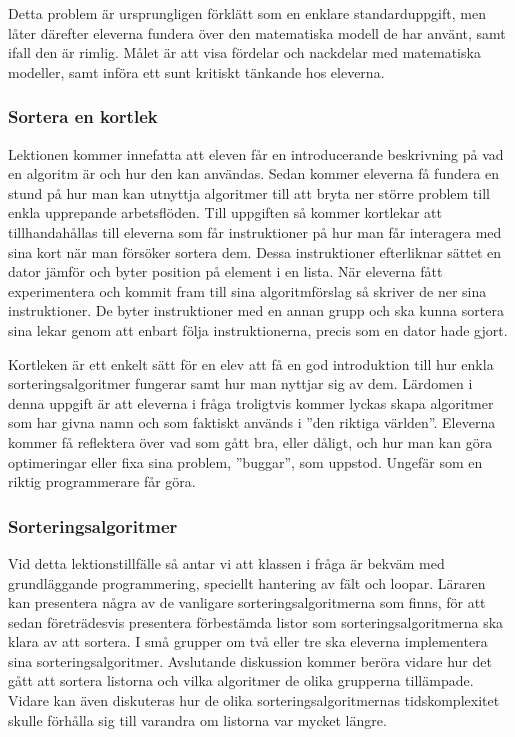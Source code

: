     \textcolor{lila}{Detta problem är ursprungligen förklätt som en enklare standarduppgift, men låter därefter eleverna fundera över den matematiska modell de har använt, samt ifall den är rimlig. Målet är att visa fördelar och nackdelar med matematiska modeller, samt införa ett sunt kritiskt tänkande hos eleverna.}
    
\subsubsection{Sortera en kortlek}
    \label{sec:Sortera}
    
    \textcolor{WildStrawberry}{
        Lektionen kommer innefatta att eleven får en introducerande beskrivning på vad en algoritm är och hur den kan användas. Sedan kommer eleverna få fundera en stund på hur man kan utnyttja algoritmer till att bryta ner större problem till enkla upprepande arbetsflöden. Till uppgiften så kommer kortlekar att tillhandahållas till eleverna som får instruktioner på hur man får interagera med sina kort när man försöker sortera dem. Dessa instruktioner efterliknar sättet en dator jämför och byter position på element i en lista. När eleverna fått experimentera och kommit fram till sina algoritmförslag så skriver de ner sina instruktioner. De byter instruktioner med en annan grupp och ska kunna sortera sina lekar genom att enbart följa instruktionerna, precis som en dator hade gjort.}
        
    \textcolor{WildStrawberry}{
        Kortleken är ett enkelt sätt för en elev att få en god introduktion till hur enkla sorteringsalgoritmer fungerar samt hur man nyttjar sig av dem. Lärdomen i denna uppgift är att eleverna i fråga troligtvis kommer lyckas skapa algoritmer som har givna namn och som faktiskt används i ''den riktiga världen''. Eleverna kommer få reflektera över vad som gått bra, eller dåligt, och hur man kan göra optimeringar eller fixa sina problem, ''buggar'', som uppstod. Ungefär som en riktig programmerare får göra. }
        
\subsubsection{Sorteringsalgoritmer}
    \label{sec:sorteringsalgoritmer}
    
    \textcolor{WildStrawberry}{
        Vid detta lektionstillfälle så antar vi att klassen i fråga är bekväm med grundläggande programmering, speciellt hantering av fält och loopar. Läraren kan presentera några av de vanligare sorteringsalgoritmerna som finns, för att sedan företrädesvis presentera förbestämda listor som sorteringsalgoritmerna ska klara av att sortera. I små grupper om två eller tre ska eleverna implementera sina sorteringsalgoritmer. Avslutande diskussion kommer beröra vidare hur det gått att sortera listorna och vilka algoritmer de olika grupperna tillämpade. Vidare kan även diskuteras hur de olika sorteringsalgoritmernas tidskomplexitet skulle förhålla sig till varandra om listorna var mycket längre.}
        
